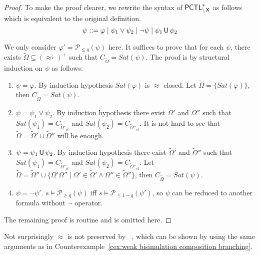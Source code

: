 \documentclass{LMCS}
\def\phi{\varphi}
\DeclareMathOperator{\interleave}{||}
\DeclareMathOperator{\U}{\text{\sf U}}
\DeclareMathOperator{\X}{\text{\sf X}}
\def\tilde{\widetilde}
\newcommand{\WBS}{\approx}
\newcommand{\PCTL}{{\sf PCTL}}
\newcommand{\MC}[1]{\mathcal{#1}}
\newcommand{\DOWNWARD}[2]{#1^{\downarrow}#2}
\begin{document}
\begin{proof}
To make the proof clearer, we rewrite the syntax of $\PCTL^{*}_{\backslash\X}$ as follows which is equivalent to the original definition.
\[\psi::=\phi\mid\psi_1\lor\psi_2\mid\neg\psi\mid\psi_1\U\psi_2\]

We only consider $\phi'=\MC{P}_{\leq q}(\psi)$ here. It suffices to prove
that for each $\psi$, there exists
$\tilde{\Omega}\subseteq (\DOWNWARD{\WBS}{})^+$ such that
$C_{\tilde{\Omega}}=\mathit{Sat}(\psi)$. The
proof is by structural induction on $\psi$ as follows:
\begin{enumerate}[(1)]
\item $\psi=\phi$. By induction hypothesis $\mathit{Sat}(\phi)$ is $\WBS$ closed. Let $\tilde{\Omega}=\{\mathit{Sat}(\phi)\}$, then $C_{\tilde{\Omega}}=\mathit{Sat}(\psi)$.
\item $\psi=\psi_1\lor\psi_2$. By induction hypothesis there exist $\tilde{\Omega}'$ and $\tilde{\Omega}''$ such that $\mathit{Sat}(\psi_1)=C_{\tilde{\Omega}'_{\mathit{st}}}$ and $\mathit{Sat}(\psi_2)=C_{\tilde{\Omega}''_{\mathit{st}}}$. It is not hard to see that $\tilde{\Omega}=\tilde{\Omega}'\cup\tilde{\Omega}''$ will be enough.
\item $\psi=\psi_1\U\psi_2$. By induction hypothesis there exist $\tilde{\Omega}'$ and $\tilde{\Omega}''$ such that $\mathit{Sat}(\psi_1)=C_{\tilde{\Omega}'_{\mathit{st}}}$ and $\mathit{Sat}(\psi_2)=C_{\tilde{\Omega}''_{\mathit{st}}}$. Let $\tilde{\Omega}=\tilde{\Omega}''\cup\{\Omega'\Omega''\mid\Omega'\in\tilde{\Omega}'\land\Omega''\in\tilde{\Omega}''\}$, then $C_{\tilde{\Omega}}=\mathit{Sat}(\psi)$.
\item $\psi=\neg\psi'$. $s\models\MC{P}_{\geq q}(\psi)$ iff
  $s\models\MC{P}_{\le 1-q}(\psi')$, so $\psi$ can be reduced to another
  formula without $\neg$ operator.
\end{enumerate}
The remaining proof is routine and is omitted here.
\end{proof}




Not surprisingly $\WBS$ is not preserved by $\interleave$, which can
be shown by using the same arguments as in
Counterexample~\ref{cex:weak bisimulation composition branching}.
\end{document}
